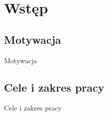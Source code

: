 \chapter{Wstęp}


\section{Motywacja}

Motywacja

\cite{Resnetx}

\section{Cele i zakres pracy}

Cele i zakres pracy
